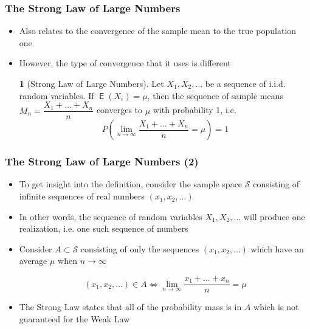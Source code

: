 \documentclass[10pt]{beamer}
\DeclareMathOperator{\E}{\mathsf{E}}
\theoremstyle{definition}
\newtheorem{definition}{\translate{Definition}}
\begin{document}
\begin{frame}[fragile]
	\frametitle{The Strong Law of Large Numbers}
	\begin{itemize}
		\item Also relates to the convergence of the sample mean to the true population one
		
		\item However, the type of convergence that it uses is different
	\begin{definition}[Strong Law of Large Numbers]
		Let $ X_{1}, X_{2}, \ldots $ be a sequence of i.i.d. random variables. If $ \E(X_{i}) = \mu $, then the sequence of sample means $ M_{n} = \dfrac{X_{1} + \ldots + X_{n}}{n}$ converges to $ \mu $ with probability 1, i.e.
		\[
			P\left(\lim_{n\to\infty}\dfrac{X_{1} + \ldots + X_{n}}{n} = \mu\right) = 1
		\]
	\end{definition}
	\end{itemize}
\end{frame}

\begin{frame}[fragile]
	\frametitle{The Strong Law of Large Numbers (2)}
	\begin{itemize}
		\item To get insight into the definition, consider the sample space $ \mathcal{S} $ consisting of infinite sequences of real numbers $ (x_{1}, x_{2},\ldots) $
		
		\item In other words, the sequence of random variables $ X_{1}, X_{2},\ldots $ will produce one realization, i.e. one such sequence of numbers
		
		\item Consider $ A \subset \mathcal{S} $ consisting of only the sequences $ (x_{1}, x_{2},\ldots) $ which have an average $ \mu $ when $ n\to\infty $
		
		\[
			 (x_{1}, x_{2},\ldots) \in A \Leftrightarrow \lim_{n\to\infty}\dfrac{x_{1} + \ldots + x_{n}}{n} = \mu
		\]
		
		\item The Strong Law states that all of the probability mass is in $ A $ which is not guaranteed for the Weak Law
	\end{itemize}
\end{frame}
\end{document}
